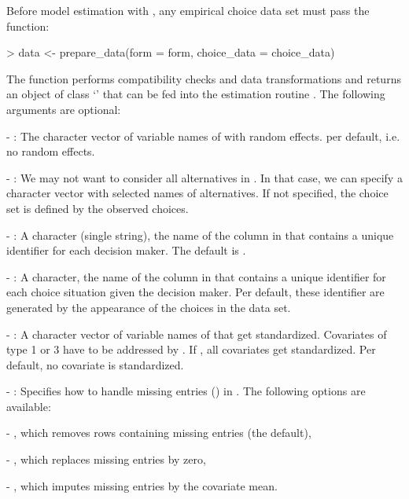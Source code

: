 \documentclass[article]{jss}
\newcommand{\class}[1]{`\code{#1}'}
\newcommand{\fct}[1]{\code{#1()}}
\begin{document}
Before model estimation with , any empirical choice data set  must pass the \fct{prepare\_data} function:

\begin{Schunk}
\begin{Sinput}
> data <- prepare_data(form = form, choice_data = choice_data)
\end{Sinput}
\end{Schunk}

The function performs compatibility checks and data transformations and returns an object of class \class{RprobitB\_data} that can be fed into the estimation routine \fct{mcmc}. The following arguments are optional:

- : The character vector of variable names of  with random effects.  per default, i.e. no random effects.

- : We may not want to consider all alternatives in . In that case, we can specify a character vector  with selected names of alternatives. If not specified, the choice set is defined by the observed choices.

- : A character (single string), the name of the column in  that contains a unique identifier for each decision maker. The default is .

- : A character, the name of the column in  that contains a unique identifier for each choice situation given the decision maker. Per default, these identifier are generated by the appearance of the choices in the data set.

- : A character vector of variable names of  that get standardized. Covariates of type 1 or 3 have to be addressed by . If , all covariates get standardized. Per default, no covariate is standardized.

- : Specifies how to handle missing entries () in . The following options are available:

  - , which removes rows containing missing entries (the default),

  - , which replaces missing entries by zero,

  - , which imputes missing entries by the covariate mean.
\end{document}
